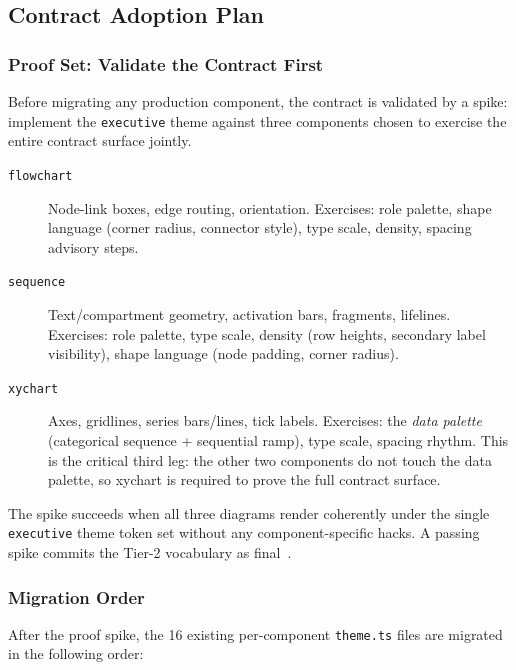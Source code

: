 \subsection{Contract Adoption Plan}
\label{sec:contract-adoption}

\subsubsection{Proof Set: Validate the Contract First}

Before migrating any production component, the contract is validated by a spike: implement
the \texttt{executive} theme against three components chosen to exercise the entire
contract surface jointly.

\begin{description}
  \item[\texttt{flowchart}] Node-link boxes, edge routing, orientation. Exercises: role
        palette, shape language (corner radius, connector style), type scale, density,
        spacing advisory steps.

  \item[\texttt{sequence}] Text/compartment geometry, activation bars, fragments, lifelines.
        Exercises: role palette, type scale, density (row heights, secondary label
        visibility), shape language (node padding, corner radius).

  \item[\texttt{xychart}] Axes, gridlines, series bars/lines, tick labels. Exercises: the
        \emph{data palette} (categorical sequence + sequential ramp), type scale, spacing
        rhythm. This is the critical third leg: the other two components do not touch the
        data palette, so xychart is required to prove the full contract surface.
\end{description}

The spike succeeds when all three diagrams render coherently under the single
\texttt{executive} theme token set without any component-specific hacks. A passing spike
commits the Tier-2 vocabulary as final~\cite{dtcg2024}.

\subsubsection{Migration Order}

After the proof spike, the 16 existing per-component \texttt{theme.ts} files are migrated
in the following order:


